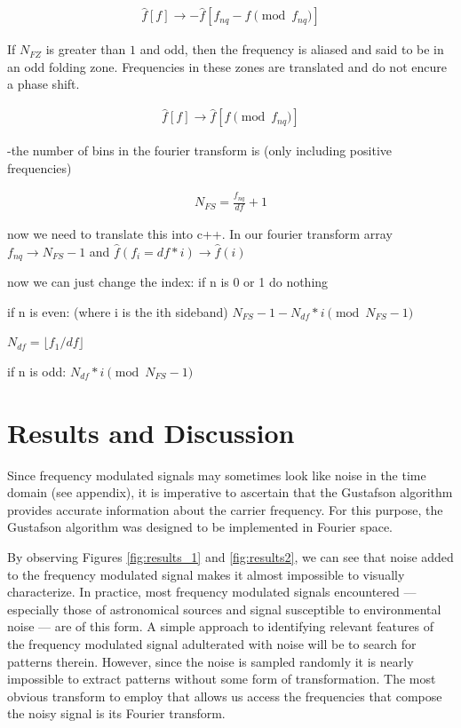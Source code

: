 \documentclass[onecolumn, groupedaddress, 10pt]{revtex4-1}
\begin{document}
\begin{align}
\hat{f}[f] \to -\hat{f}[f_{nq} - f \pmod{f_{nq}} ]
\end{align}

If $N_{FZ}$ is greater than $1$ and odd, then the frequency is aliased and said to be in an odd folding zone.  Frequencies in these zones are translated and do not encure a phase shift.

\begin{align}
\hat{f}[f] \to \hat{f}[f \pmod{f_{nq}} ]
\end{align}




-the number of bins in the fourier transform is (only including positive frequencies)

\begin{align}
N_{FS}=\frac{f_{nq}}{df} + 1
\end{align}


now we need to translate this into c++.  In our fourier transform array 
$f_{nq} \to N_{FS} - 1$
and
$\hat{f}(f_i = df * i) \to \hat{f} (i) $

now we can just change the index:
if n is 0 or 1 do nothing

if n is even: (where i is the ith sideband)
$N_{FS} - 1 - N_{df} * i \pmod{N_{FS} - 1}$

$N_{df} = \lfloor f_1 / df \rfloor $

if n is odd: 
$N_{df} * i \pmod{N_{FS} - 1}$


\section{Results and Discussion}














Since frequency modulated signals may sometimes look like noise in the time domain (see appendix), it is imperative to ascertain that the Gustafson algorithm provides accurate information about the carrier frequency. For this purpose, the Gustafson algorithm was designed to be implemented in Fourier space.

By observing Figures \ref{fig:results_1} and \ref{fig:results2}, we can see that noise added to the frequency modulated signal makes it almost impossible to visually characterize. In practice, most frequency modulated signals encountered --- especially those of astronomical sources and signal susceptible to environmental noise --- are of this form. A simple approach to identifying relevant features of the frequency modulated signal adulterated with noise will be to search for patterns therein. However, since the noise is sampled randomly it is nearly impossible to extract patterns without some form of transformation. The most obvious transform to employ that allows us access the frequencies that compose the noisy signal is its Fourier transform.
\end{document}
